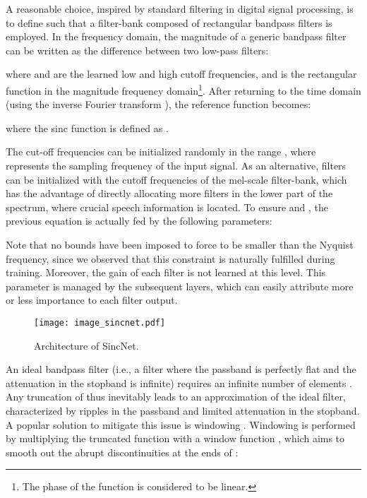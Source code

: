 \documentclass{article}
\begin{document}
A reasonable choice, inspired by standard filtering in digital signal processing, is to define  such that a filter-bank composed of rectangular bandpass filters is employed. In the frequency domain, the magnitude of a generic bandpass filter can be written as the difference between two low-pass filters:


where  and  are the learned low and high cutoff frequencies, and  is the rectangular function in the magnitude frequency domain\footnote{The phase of the  function is considered to be linear.}.
After returning to the time domain (using the inverse Fourier transform \cite{rabiner11}), the reference function  becomes:


where the sinc function is defined as . 

The cut-off frequencies can be initialized randomly in the range , where  represents the sampling frequency of the input signal.  
As an alternative, filters can be initialized with the cutoff frequencies of the mel-scale filter-bank, which has the advantage  of directly allocating more filters in the lower part of the spectrum, where crucial speech information is located.
To ensure  and , the previous equation is actually fed by the following parameters:




Note that no bounds have been imposed to force  to be smaller than the Nyquist frequency, since we observed that this constraint is naturally fulfilled during training. 
Moreover, the gain of each filter is not learned at this level. This parameter is managed by the subsequent layers, which can easily attribute more or less importance to each filter output. 



 \begin{figure}[t!]
 \centering
   \texttt{[image: image\_sincnet.pdf]}
 \caption{Architecture of SincNet.}
 \label{fig:sinc_arch}
 \end{figure}
 
 



 
An ideal bandpass filter (i.e., a filter where the passband is perfectly flat and the attenuation in the stopband is infinite) requires an infinite number of elements . Any truncation of  thus inevitably leads to an approximation of the ideal filter, characterized by ripples in the passband and limited  attenuation  in  the  stopband.   A popular solution to mitigate this issue is windowing \cite{rabiner11}. Windowing is performed by multiplying the truncated function  with a window function , which aims to smooth out the abrupt discontinuities at the  ends  of  :
\end{document}
